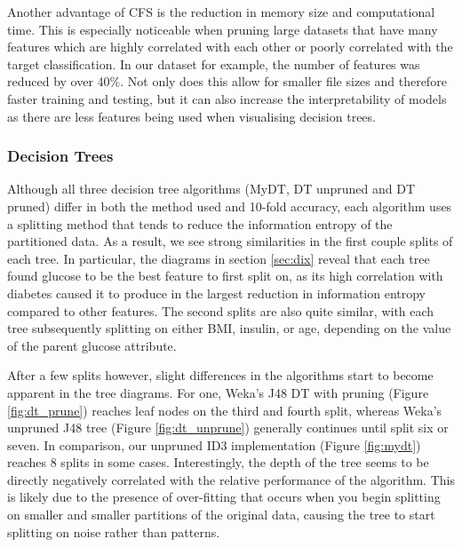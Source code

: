 Another advantage of CFS is the reduction in memory size and computational time. This is especially noticeable when pruning large datasets that have many features which are highly correlated with each other  or poorly correlated with the target classification. In our dataset for example, the number of features was reduced by over 40\%. Not only does this allow for smaller file sizes and therefore faster training and testing, but it can also increase the interpretability of models as there are less features being used when visualising decision trees.

\subsubsection{Decision Trees}
\label{sec:dis_dt}

 
Although all three decision tree algorithms (MyDT, DT unpruned and DT pruned) differ in both the method used and 10-fold accuracy, each algorithm uses a splitting method that tends to reduce the information entropy of the partitioned data. As a result, we see strong similarities in the first couple splits of each tree. In particular, the diagrams in section \ref{sec:dix} reveal that each tree found glucose to be the best feature to first split on, as its high correlation with diabetes caused it to produce in the largest reduction in information entropy compared to other features. The second splits are also quite similar, with each tree subsequently splitting on either BMI, insulin, or age, depending on the value of the parent glucose attribute.

After a few splits however, slight differences in the algorithms start to become apparent in the tree diagrams. For one, Weka's J48 DT with pruning (Figure \ref{fig:dt_prune}) reaches leaf nodes on the third and fourth split, whereas Weka's unpruned J48 tree (Figure \ref{fig:dt_unprune}) generally continues until split six or seven. In comparison, our unpruned ID3 implementation (Figure \ref{fig:mydt}) reaches 8 splits in some cases. Interestingly, the depth of the tree seems to be directly negatively correlated with the relative performance of the algorithm. This is likely due to the presence of over-fitting that occurs when you begin splitting on smaller and smaller partitions of the original data, causing the tree to start splitting on noise rather than patterns.

